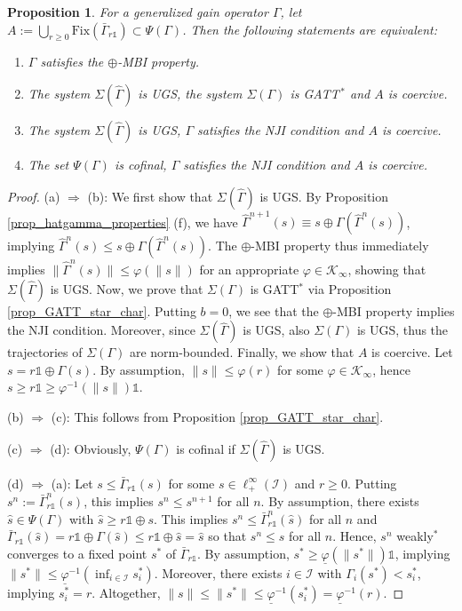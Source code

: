 \documentclass[10pt, oneside, a4paper]{article}
\newcommand{\unit}{\mathds{1}}
\newcommand{\Fix}{\mathrm{Fix}}
\newcommand{\IC}{\mathcal{I}}
\newcommand{\KC}{\mathcal{K}}
\newcommand{\bsign}[1]{\bar{#1}}
\newtheorem{proposition}{Proposition}[section]
\begin{document}
\begin{proposition}\label{prop_maxmbi_char}
For a generalized gain operator $\Gamma$, let $A := \bigcup_{r \geq 0}\Fix(\bsign{\Gamma}_{r\unit}) \subset \Psi(\Gamma)$. Then the following statements are equivalent:%
\begin{enumerate}
\item[(a)] $\Gamma$ satisfies the $\oplus$-MBI property.%
\item[(b)] The system $\Sigma(\hat{\Gamma})$ is UGS, the system $\Sigma(\Gamma)$ is GATT$^{\,*}$ and $A$ is coercive.%
\item[(c)] The system $\Sigma(\hat{\Gamma})$ is UGS, $\Gamma$ satisfies the NJI condition and $A$ is coercive.%
\item[(d)] The set $\Psi(\Gamma)$ is cofinal, $\Gamma$ satisfies the NJI condition and $A$ is coercive.%
\end{enumerate}
\end{proposition}

\begin{proof}
(a) $\Rightarrow$ (b): We first show that $\Sigma(\hat{\Gamma})$ is UGS. By Proposition \ref{prop_hatgamma_properties} (f), we have $\hat{\Gamma}^{n+1}(s) \equiv s \oplus \Gamma(\hat{\Gamma}^n(s))$, implying $\hat{\Gamma}^n(s) \leq s \oplus \Gamma(\hat{\Gamma}^n(s))$. The $\oplus$-MBI property thus immediately implies $\|\hat{\Gamma}^n(s)\| \leq \varphi(\|s\|)$ for an appropriate $\varphi \in \KC_{\infty}$, showing that $\Sigma(\hat{\Gamma})$ is UGS. Now, we prove that $\Sigma(\Gamma)$ is GATT$^*$ via Proposition \ref{prop_GATT_star_char}. Putting $b = 0$, we see that the $\oplus$-MBI property implies the NJI condition. Moreover, since $\Sigma(\hat{\Gamma})$ is UGS, also $\Sigma(\Gamma)$ is UGS, thus the trajectories of $\Sigma(\Gamma)$ are norm-bounded. Finally, we show that $A$ is coercive. Let $s = r\unit \oplus \Gamma(s)$. By assumption, $\|s\| \leq \varphi(r)$ for some $\varphi \in \KC_{\infty}$, hence $s \geq r\unit \geq \varphi^{-1}(\|s\|)\unit$.%

(b) $\Rightarrow$ (c): This follows from Proposition \ref{prop_GATT_star_char}.%

(c) $\Rightarrow$ (d): Obviously, $\Psi(\Gamma)$ is cofinal if $\Sigma(\hat{\Gamma})$ is UGS.%

(d) $\Rightarrow$ (a): Let $s \leq \bsign{\Gamma}_{r\unit}(s)$ for some $s \in \ell^{\infty}_+(\IC)$ and $r \geq 0$.  Putting $s^n := \bsign{\Gamma}_{r\unit}^n(s)$, this implies $s^n \leq s^{n+1}$ for all $n$. By assumption, there exists $\hat{s} \in \Psi(\Gamma)$ with $\hat{s} \geq r\unit \oplus s$. This implies $s^n \leq \bsign{\Gamma}_{r\unit}^n(\hat{s})$ for all $n$ and $\bsign{\Gamma}_{r\unit}(\hat{s}) = r\unit \oplus \Gamma(\hat{s}) \leq r\unit \oplus \hat{s} = \hat{s}$ so that $s^n \leq \hat{s}$ for all $n$. Hence, $s^n$ weakly$^*$ converges to a fixed point $s^*$ of $\bsign{\Gamma}_{r\unit}$. By assumption, $s^* \geq \underline{\varphi}(\|s^*\|)\unit$, implying $\|s^*\| \leq \underline{\varphi}^{-1}(\inf_{i\in\IC}s^*_i)$. Moreover, there exists $i \in \IC$ with $\Gamma_i(s^*) < s^*_i$, implying $s^*_i = r$. Altogether, $\|s\| \leq \|s^*\| \leq \underline{\varphi}^{-1}(s^*_i) = \underline{\varphi}^{-1}(r)$.
\end{proof}
\end{document}
